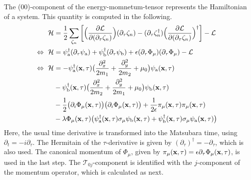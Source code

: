 The (00)-component of the energy-momnetum-tensor represents the Hamiltonian of a system.
This quantity is computed in the following.
%
\begin{align}
	\mathcal{H} &= 
		\frac{1}{2} \sum\limits_{\zeta_{n}} \bigg[
		\Big(\frac{\partial\mathcal{L}}{\partial(\partial_{\tau}\zeta_{n})}\Big) (\partial_{\tau}\zeta_{n}) 
		-
		(\partial_{\tau}\zeta_{n}^{\dag}) \Big(\frac{\partial\mathcal{L}}{\partial(\partial_{\tau}\zeta_{n})}\Big)^{\dag}
		\bigg]
		-
		\mathcal{L}
		\notag \\
	\Leftrightarrow\ \mathcal{H} &= 
		\psi_{\mathrm{a}}^{\dag} (\partial_{\tau}\psi_{\mathrm{a}}) 
		+
		\psi_{\mathrm{b}}^{\dag} (\partial_{\tau}\psi_{\mathrm{b}}) 
		+
		\epsilon  (\partial_{\tau} \Phi_{\mu}) (\partial_{\tau} \Phi_{\mu}) 
		-
		\mathcal{L}
	\notag \\
	\Leftrightarrow\ \mathcal{H} &= 
		-
		\psi_{\mathrm{a}}^{\dag}(\vb{x},\tau) \big(\frac{\partial_{x}^{2}}{2m_{1}} + \frac{\partial_{y}^{2}}{2m_{2}} + \mu_{0}\big) \psi_{\mathrm{a}}(\vb{x},\tau)
		\notag \\&
		- 
		\psi_{\mathrm{b}}^{\dag}(\vb{x},\tau) \big(\frac{\partial_{x}^{2}}{2m_{2}} + \frac{\partial_{y}^{2}}{2m_{1}} + \mu_{0}\big) \psi_{\mathrm{b}}(\vb{x},\tau)
		\notag \\&
		- 
		\frac{1}{2} \big(\partial_{i} \Phi_{\mu}(\vb{x},\tau)\big) \big(\partial_{i} \Phi_{\mu}(\vb{x},\tau)\big)
		+ 
		\frac{1}{2\epsilon} \pi_{\mu}(\vb{x},\tau) \pi_{\mu}(\vb{x},\tau)
		\notag \\&
		-	
		\lambda \Phi_{\mu}(\vb{x},\tau) \big(\psi_{\mathrm{a}}^{\dag}(\vb{x},\tau) \sigma_{\mu} \psi_{\mathrm{b}}(\vb{x},\tau) + \psi_{\mathrm{b}}^{\dag}(\vb{x},\tau) \sigma_{\mu} \psi_{\mathrm{a}}(\vb{x},\tau)\big)
\end{align}
%
Here, the usual time derivative is transformed into the Matsubara time, using $\partial_{t} = -i\partial_{\tau}$.
The Hermitain of the $\tau$-derivative is given by $(\partial_{\tau})^{\dag} = -\partial_{\tau}$, which is also used.
The canonical momentum of $\Phi_{\mu}$, given by $\pi_{\mu}(\vb{x},\tau) = \epsilon \partial_{\tau} \Phi_{\mu}(\vb{x},\tau)$, is used in the last step.
The $\mathcal{T}_{0j}$-component is identified with the $j$-component of the momentum operator, which is calculated as next.
%
